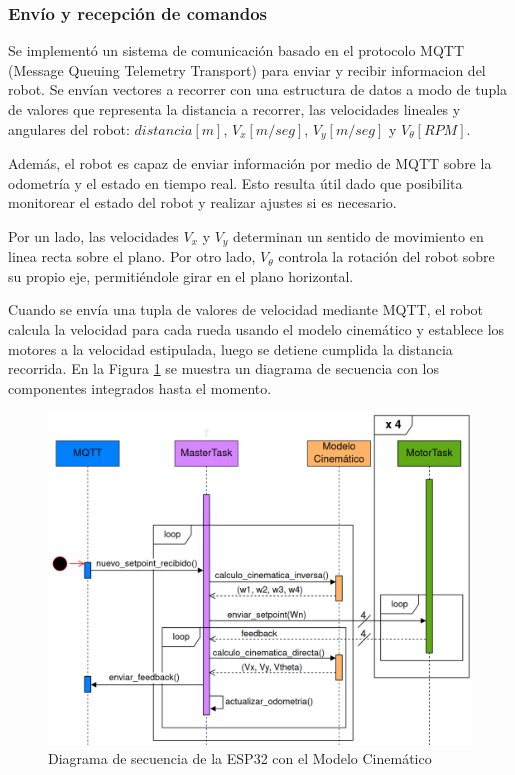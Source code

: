 \subsubsection{Envío y recepción de comandos}

Se implementó un sistema de comunicación basado en el protocolo MQTT (Message Queuing Telemetry Transport) para enviar y recibir informacion del robot. Se envían vectores a recorrer con una estructura de datos a modo de tupla de valores que representa la distancia a recorrer, las velocidades lineales y angulares del robot: $distancia [m]$, $V_x [m/seg]$, $V_y [m/seg]$ y $V_\theta [RPM]$.

Además, el robot es capaz de enviar información por medio de MQTT sobre la odometría y el estado en tiempo real. Esto resulta útil dado que posibilita monitorear el estado del robot y realizar ajustes si es necesario.

Por un lado, las velocidades $V_x$ y $V_y$ determinan un sentido de movimiento en linea recta sobre el plano. Por otro lado, $V_\theta$ controla la rotación del robot sobre su propio eje, permitiéndole girar en el plano horizontal.

Cuando se envía una tupla de valores de velocidad mediante MQTT, el robot calcula la velocidad para cada rueda usando el modelo cinemático y establece los motores a la velocidad estipulada, luego se detiene cumplida la distancia recorrida. En la Figura \ref{fig:diagcomponentesp32conmodelocinem} se muestra un diagrama de secuencia con los componentes integrados hasta el momento.

\begin{figure}[htb]
    \centering
    \includegraphics[width=1\linewidth]{images/diag_secuencia_full_modelo_cinematico.png}
    \caption{Diagrama de secuencia de la ESP32 con el Modelo Cinemático}
    \label{fig:diagcomponentesp32conmodelocinem}
\end{figure}
